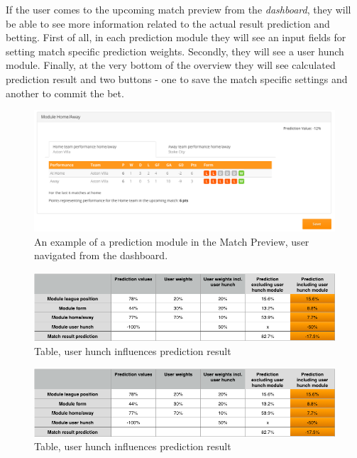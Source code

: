If the user comes to the upcoming match preview from the \emph{dashboard}, they will be able to see more information related to the actual result prediction and betting.
First of all, in each prediction module they will see an input fields for setting match specific prediction weights. Secondly, they will see a user hunch module. Finally, at the very bottom of the overview they will see calculated prediction result and two buttons - one to save the match specific settings and another to commit the bet.

\begin{figure}[H]
\begin{center}
\includegraphics[width=.90\linewidth,natwidth=610,natheight=642]{impl/images/matchoverviewex_from_main_page}
\caption{An example of a prediction module in the Match Preview, user navigated from the dashboard.} \label{fig:using: matchoverviewex_from_main_page}
\end{center}
\end{figure}


 
\begin{figure}[H]
\begin{center}
\includegraphics[width=.90\linewidth,natwidth=610,natheight=642]{impl/images/hunchinfluence}
\caption{Table, user hunch influences prediction result} \label{fig:using:footballapiwrapperfields}
\end{center}
\end{figure}




\begin{figure}[H]
\begin{center}
\includegraphics[width=.90\linewidth,natwidth=610,natheight=642]{impl/images/hunchinfluence}
\caption{Table, user hunch influences prediction result} \label{fig:using:footballapiwrapperfields}
\end{center}
\end{figure}

